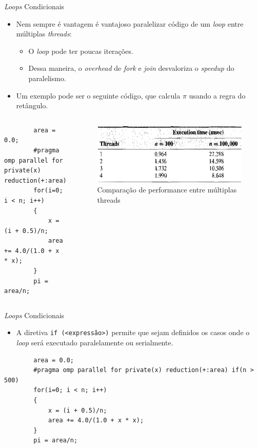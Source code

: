 \begin{frame}[fragile]{\textit{Loops} Condicionais}
	\begin{itemize}
		\item Nem sempre é vantagem é vantajoso paralelizar código de um \textit{loop} entre múltiplas \textit{threads}:
		\medskip
		\begin{itemize}
			\item O \textit{loop} pode ter poucas iterações.
			\smallskip
			\item Dessa maneira, o \textit{overhead} de \textit{fork} e \textit{join} desvaloriza o \textit{speedup} do paralelismo.
		\end{itemize}
		\medskip
		\item Um exemplo pode ser o seguinte código, que calcula $\pi$ usando a regra do retângulo.
	\end{itemize}
	\begin{columns}
		\begin{verbatim}
		area = 0.0;
		#pragma omp parallel for private(x) reduction(+:area)
		for(i=0; i < n; i++)
		{
			x = (i + 0.5)/n;
			area += 4.0/(1.0 + x * x);
		}
		pi = area/n;
		\end{verbatim}
		\begin{figure}[H]
			\centering
			\includegraphics[width=0.8\linewidth]{img/quinn/tab-cond-loop}
			\caption[Comparação de performance entre múltiplas threads]{Comparação de performance entre múltiplas threads}
			\label{fig:tab-cond-loop}
		\end{figure}
	\end{columns}
	
\end{frame}

\begin{frame}[fragile]{\textit{Loops} Condicionais}
	\begin{itemize}
		\item A diretiva \texttt{if (<expressão>)} permite que sejam definidos os casos onde o \textit{loop} será executado paralelamente ou serialmente.
	\end{itemize}
		\begin{verbatim}
		area = 0.0;
		#pragma omp parallel for private(x) reduction(+:area) if(n > 500)
		for(i=0; i < n; i++)
		{
			x = (i + 0.5)/n;
			area += 4.0/(1.0 + x * x);
		}
		pi = area/n;
		\end{verbatim}
\end{frame}

